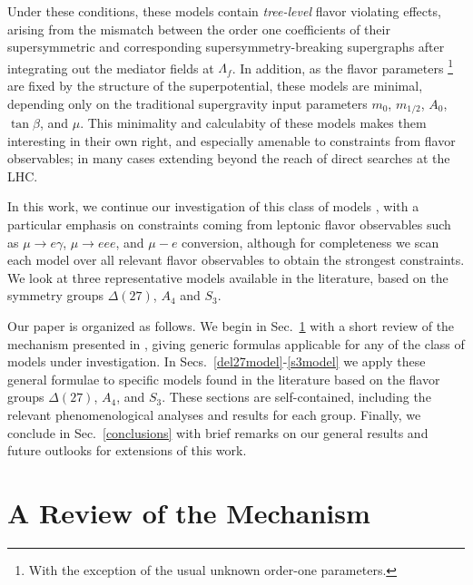 \documentclass[a4paper,11pt]{article}
\begin{document}
Under these conditions, these models contain \emph{tree-level} flavor violating effects, arising from the mismatch between the order one coefficients of their supersymmetric and corresponding supersymmetry-breaking supergraphs after integrating out the mediator fields at $\Lambda_f$. In addition, as the flavor parameters \footnote{With the exception of the usual unknown order-one parameters.} are fixed by the structure of the superpotential, these models are minimal, depending only on the traditional supergravity input parameters $m_0$, $m_{1/2}$, $A_0$, $\tan \beta$, and $\mu$. This minimality and calculabity of these models makes them interesting in their own right, and especially amenable to constraints from flavor observables; in many cases extending beyond the reach of direct searches at the LHC.   


In this work, we continue our investigation of this class of models \cite{Das:2016czs,Calibbi:2012yj,Antusch:2011sq}, with a particular emphasis on constraints coming from leptonic flavor observables such as $\mu \rightarrow e \gamma$, $\mu \rightarrow eee$, and $\mu - e$ conversion, although for completeness we scan each model over all relevant flavor observables to obtain the strongest constraints. We look at three representative models available in the literature, based on the symmetry groups $\Delta(27)$, $A_4$ and $S_3$. 

Our paper is organized as follows. We begin in Sec.~\ref{overview} with a short review of the mechanism presented in  \cite{Das:2016czs}, giving generic formulas applicable for any of the class of models under investigation. In Secs.~\ref{del27model}-\ref{s3model} we apply these general formulae to specific models found in the literature based on the flavor groups $\Delta(27)$, $A_4$, and $S_3$. These sections are self-contained, including the relevant phenomenological analyses and results for each group. Finally, we conclude in Sec.~\ref{conclusions} with brief remarks on our general results and future outlooks for extensions of this work. 


\section{A Review of the Mechanism}
\label{overview}
\end{document}
